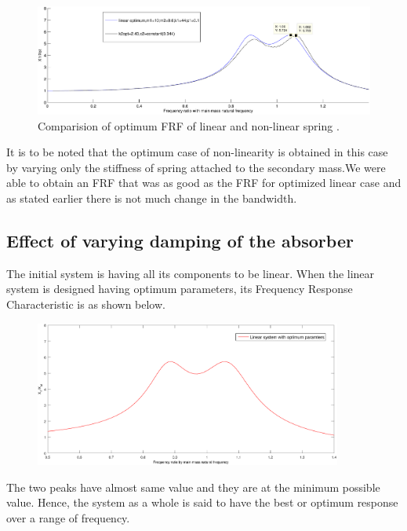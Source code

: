 \begin{figure}[h!]
  \includegraphics[width=\textwidth,height=0.5\textwidth]{"figures/nonlinearity_primaryymass_3b_effect of secondaryspring_only optimums"}
  \caption{Comparision of optimum FRF of linear and non-linear spring .}
  \label{fig:optimum stiffness}
\end{figure}

It is to be noted that  the optimum case of non-linearity is obtained in this case by varying only the stiffness of spring attached to the secondary mass.We were able to obtain an FRF that was as good as the FRF for optimized linear case and as stated earlier there is not much change in the bandwidth.

\subsection{Effect of varying damping of the absorber}
The initial system is having all its components to be linear. When the linear system is designed having optimum parameters, its Frequency Response Characteristic is as shown below.\\[0.2in]
\begin{figure}[h!]
\includegraphics[width=0.9\textwidth]{"figures/linear"}\\[0.1in]
\end{figure}
The two peaks have almost same value and they are at the minimum possible value. Hence, the system as a whole is said to have the best or optimum response over a range of frequency.

